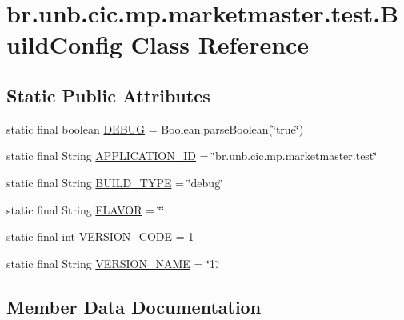 \hypertarget{classbr_1_1unb_1_1cic_1_1mp_1_1marketmaster_1_1test_1_1BuildConfig}{}\section{br.\+unb.\+cic.\+mp.\+marketmaster.\+test.\+Build\+Config Class Reference}
\label{classbr_1_1unb_1_1cic_1_1mp_1_1marketmaster_1_1test_1_1BuildConfig}
\subsection*{Static Public Attributes}
\begin{DoxyCompactItemize}
\item 
static final boolean \mbox{\hyperlink{classbr_1_1unb_1_1cic_1_1mp_1_1marketmaster_1_1test_1_1BuildConfig_a36d71ff71e5c2540a05c4b45051653b7}{D\+E\+B\+UG}} = Boolean.\+parse\+Boolean(\char`\"{}true\char`\"{})
\item 
static final String \mbox{\hyperlink{classbr_1_1unb_1_1cic_1_1mp_1_1marketmaster_1_1test_1_1BuildConfig_a01f1b422a8c9add26b0f35f3bf5f567f}{A\+P\+P\+L\+I\+C\+A\+T\+I\+O\+N\+\_\+\+ID}} = \char`\"{}br.\+unb.\+cic.\+mp.\+marketmaster.\+test\char`\"{}
\item 
static final String \mbox{\hyperlink{classbr_1_1unb_1_1cic_1_1mp_1_1marketmaster_1_1test_1_1BuildConfig_aa8344679f8496c1675bc680e0e84b893}{B\+U\+I\+L\+D\+\_\+\+T\+Y\+PE}} = \char`\"{}debug\char`\"{}
\item 
static final String \mbox{\hyperlink{classbr_1_1unb_1_1cic_1_1mp_1_1marketmaster_1_1test_1_1BuildConfig_a445e313de80849ec45cfefacfe1ecf89}{F\+L\+A\+V\+OR}} = \char`\"{}\char`\"{}
\item 
static final int \mbox{\hyperlink{classbr_1_1unb_1_1cic_1_1mp_1_1marketmaster_1_1test_1_1BuildConfig_abe3dd6c5aa62b3e5ffbdb6ea5a7d435e}{V\+E\+R\+S\+I\+O\+N\+\_\+\+C\+O\+DE}} = 1
\item 
static final String \mbox{\hyperlink{classbr_1_1unb_1_1cic_1_1mp_1_1marketmaster_1_1test_1_1BuildConfig_addc5ad65e90e02e57faeb37eb7669dd4}{V\+E\+R\+S\+I\+O\+N\+\_\+\+N\+A\+ME}} = \char`\"{}1.\char`\"{}
\end{DoxyCompactItemize}


\subsection{Member Data Documentation}
\mbox{\label{classbr_1_1unb_1_1cic_1_1mp_1_1marketmaster_1_1test_1_1BuildConfig_a01f1b422a8c9add26b0f35f3bf5f567f}} 
